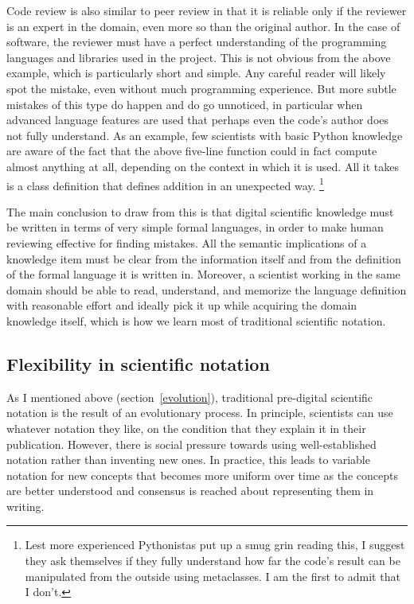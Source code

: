 Code review is also similar to peer review in that it is reliable only if the reviewer is an expert in the domain, even more so than the original author. In the case of software, the reviewer must have a perfect understanding of the programming languages and libraries used in the project. This is not obvious from the above example, which is particularly short and simple. Any careful reader will likely spot the mistake, even without much programming experience. But more subtle mistakes of this type do happen and do go unnoticed, in particular when advanced language features are used that perhaps even the code's author does not fully understand. As an example, few scientists with basic Python knowledge are aware of the fact that the above five-line function could in fact compute almost anything at all, depending on the context in which it is used. All it takes is a class definition that defines addition in an unexpected way. \footnote{Lest more experienced Pythonistas put up a smug grin reading this, I suggest they ask themselves if they fully understand how far the code's result can be manipulated from the outside using metaclasses. I am the first to admit that I don't.}

The main conclusion to draw from this is that digital scientific knowledge must be written in terms of very simple formal languages, in order to make human reviewing effective for finding mistakes. All the semantic implications of a knowledge item must be clear from the information itself and from the definition of the formal language it is written in. Moreover, a scientist working in the same domain should be able to read, understand, and memorize the language definition with reasonable effort and ideally pick it up while acquiring the domain knowledge itself, which is how we learn most of traditional scientific notation.

\subsection{Flexibility in scientific notation}
\label{flexibility}

As I mentioned above (section~\ref{evolution}), traditional pre-digital scientific notation is the result of an evolutionary process. In principle, scientists can use whatever notation they like, on the condition that they explain it in their publication. However, there is social pressure towards using well-established notation rather than inventing new ones. In practice, this leads to variable notation for new concepts that becomes more uniform over time as the concepts are better understood and consensus is reached about representing them in writing.


